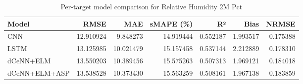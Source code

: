 \begin{table}
\caption{Per-target model comparison for Relative Humidity 2M Pct}
\begin{tabular}{lrrrrrr}
\toprule
Model & RMSE & MAE & sMAPE (\%) & R² & Bias & NRMSE \\
\midrule
CNN & 12.910924 & 9.848273 & 14.919444 & 0.552187 & 1.993517 & 0.175388 \\
LSTM & 13.125985 & 10.021479 & 15.157458 & 0.537144 & 2.212889 & 0.178310 \\
dCeNN+ELM & 13.550203 & 10.389456 & 15.575263 & 0.507313 & 1.969121 & 0.184018 \\
dCeNN+ELM+ASP & 13.538528 & 10.373430 & 15.563259 & 0.508161 & 1.967138 & 0.183859 \\
\bottomrule
\end{tabular}
\end{table}
